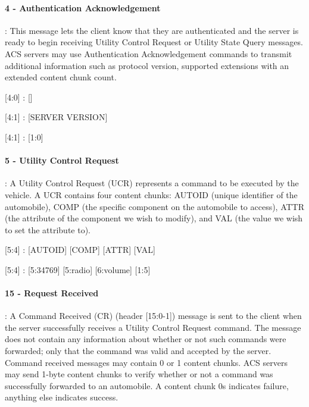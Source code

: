 \paragraph{4 - Authentication Acknowledgement}: This message lets the client know that they are authenticated and the server is ready to begin receiving Utility Control Request or Utility State Query messages. ACS servers may use Authentication Acknowledgement commands to transmit additional information such as protocol version, supported extensions with an extended content chunk count.

\begin{center}
{\textsf{[4:0] : []}}

{\textsf{[4:1] : [SERVER VERSION]}}

{\textsf{[4:1] : [1:0]}}
\end{center}

\paragraph{5 - Utility Control Request}: A Utility Control Request (UCR) represents a command to be executed by the vehicle. A UCR contains four content chunks: AUTOID (unique identifier of the automobile), COMP (the specific component on the automobile to access), ATTR (the attribute of the component we wish to modify), and VAL (the value we wish to set the attribute to).

\begin{center}
{\textsf{[5:4] : [AUTOID] [COMP] [ATTR] [VAL]}}

{\textsf{[5:4] : [5:34769] [5:radio] [6:volume] [1:5]}}
\end{center}

\paragraph{15 - Request Received}: A Command Received (CR) (header [15:0-1]) message is sent to the client when the server successfully receives a Utility Control Request command. The message does not contain any information
about whether or not such commands were forwarded; only that the command was valid and accepted by the server. Command received messages may contain 0 or 1 content chunks. ACS servers may send 1-byte content chunks to verify whether or not a command was successfully forwarded to an automobile. A content chunk 0s indicates failure, anything else indicates success.

